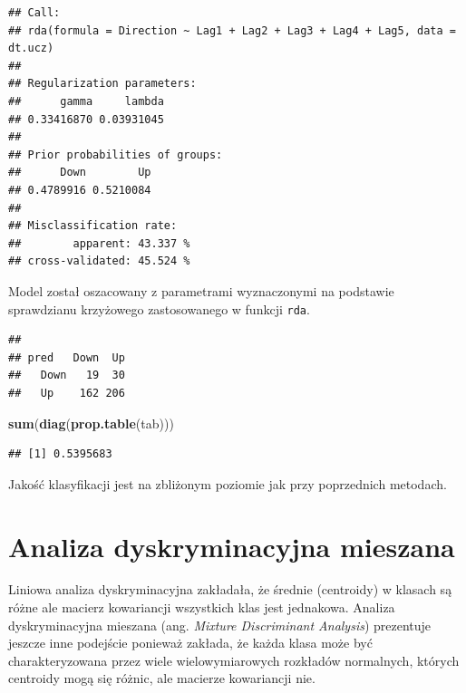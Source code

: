 \documentclass[]{book}
\newenvironment{Shaded}{\begin{snugshade}}{\end{snugshade}}
\newcommand{\DataTypeTok}[1]{\textcolor[rgb]{0.13,0.29,0.53}{#1}}
\newcommand{\KeywordTok}[1]{\textcolor[rgb]{0.13,0.29,0.53}{\textbf{#1}}}
\newcommand{\NormalTok}[1]{#1}
\newcommand{\OperatorTok}[1]{\textcolor[rgb]{0.81,0.36,0.00}{\textbf{#1}}}
\newcommand{\StringTok}[1]{\textcolor[rgb]{0.31,0.60,0.02}{#1}}
\theoremstyle{plain}
\theoremstyle{definition}
\theoremstyle{definition}
\theoremstyle{definition}
\theoremstyle{definition}
\theoremstyle{remark}
\begin{document}
\begin{verbatim}
## Call: 
## rda(formula = Direction ~ Lag1 + Lag2 + Lag3 + Lag4 + Lag5, data = dt.ucz)
## 
## Regularization parameters: 
##      gamma     lambda 
## 0.33416870 0.03931045 
## 
## Prior probabilities of groups: 
##      Down        Up 
## 0.4789916 0.5210084 
## 
## Misclassification rate: 
##        apparent: 43.337 %
## cross-validated: 45.524 %
\end{verbatim}

Model został oszacowany z parametrami wyznaczonymi na podstawie sprawdzianu krzyżowego zastosowanego w funkcji \texttt{rda}.

\begin{Shaded}
\end{Shaded}

\begin{verbatim}
##       
## pred   Down  Up
##   Down   19  30
##   Up    162 206
\end{verbatim}

\begin{Shaded}
\begin{Highlighting}[]
\KeywordTok{sum}\NormalTok{(}\KeywordTok{diag}\NormalTok{(}\KeywordTok{prop.table}\NormalTok{(tab)))}
\end{Highlighting}
\end{Shaded}

\begin{verbatim}
## [1] 0.5395683
\end{verbatim}

Jakość klasyfikacji jest na zbliżonym poziomie jak przy poprzednich metodach.

\hypertarget{analiza-dyskryminacyjna-mieszana}{%
\section{Analiza dyskryminacyjna mieszana}\label{analiza-dyskryminacyjna-mieszana}}

Liniowa analiza dyskryminacyjna zakładała, że średnie (centroidy) w klasach są różne ale macierz kowariancji wszystkich klas jest jednakowa. Analiza dyskryminacyjna mieszana (ang. \emph{Mixture Discriminant Analysis}) prezentuje jeszcze inne podejście ponieważ zakłada, że każda klasa może być charakteryzowana przez wiele wielowymiarowych rozkładów normalnych, których centroidy mogą się różnic, ale macierze kowariancji nie.
\end{document}
